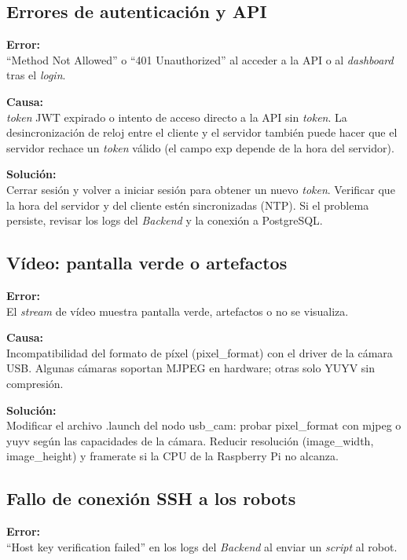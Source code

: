 \documentclass[12pt]{article}
\numberwithin{figure}{section}
\numberwithin{table}{section}
\def\code#1{#1}%
\def\file#1{#1}%
\newcommand{\code}[1]{\textcolor{codeblue}{\url{#1}}}
\newcommand{\file}[1]{\textcolor{darkblue}{\texttt{#1}}}
\begin{document}
\subsection{Errores de autenticación y API}

\textbf{Error:}\\
``Method Not Allowed'' o ``401 Unauthorized'' al acceder a la API o al \textit{dashboard} tras el \textit{login}.

\textbf{Causa:}\\
\textit{token} JWT expirado o intento de acceso directo a la API sin \textit{token}. La desincronización de reloj entre el cliente y el servidor también puede hacer que el servidor rechace un \textit{token} válido (el campo \code{exp} depende de la hora del servidor).

\textbf{Solución:}\\
Cerrar sesión y volver a iniciar sesión para obtener un nuevo \textit{token}. Verificar que la hora del servidor y del cliente estén sincronizadas (NTP). Si el problema persiste, revisar los logs del \textit{Backend} y la conexión a PostgreSQL.


\subsection{Vídeo: pantalla verde o artefactos}

\textbf{Error:}\\
El \textit{stream} de vídeo muestra pantalla verde, artefactos o no se visualiza.

\textbf{Causa:}\\
Incompatibilidad del formato de píxel (\code{pixel\_format}) con el driver de la cámara USB. Algunas cámaras soportan MJPEG en hardware; otras solo YUYV sin compresión.

\textbf{Solución:}\\
Modificar el archivo \file{.launch} del nodo \code{usb\_cam}: probar \code{pixel\_format} con \code{mjpeg} o \code{yuyv} según las capacidades de la cámara. Reducir resolución (\code{image\_width}, \code{image\_height}) y \code{framerate} si la CPU de la Raspberry Pi no alcanza.

\subsection{Fallo de conexión SSH a los robots}
\textbf{Error:}\\
``Host key verification failed'' en los logs del \textit{Backend} al enviar un \textit{script} al robot.
\end{document}
